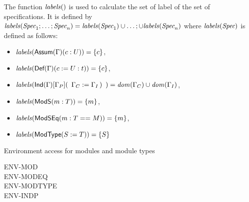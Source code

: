 The function $\mathit{labels}()$ is used to calculate the set of label of
the set of specifications. It is defined by
$\mathit{labels}(\textit{Spec}_1;\dots;\textit{Spec}_n)=\mathit{labels}(\textit{Spec}_1)\cup\dots;\cup\mathit{labels}(\textit{Spec}_n)$
where $\mathit{labels}(\textit{Spec})$ is defined as follows:
\begin{itemize}
\item $\mathit{labels}(\mbox{{\sf Assum}$(\Gamma)(c:U)$})=\{c\}$,
\item $\mathit{labels}(\mbox{{\sf Def}$(\Gamma)(c:=U:t)$})=\{c\}$,
\item
  $\mathit{labels}(\mbox{{\sf Ind}$(\Gamma)[\Gamma_P](\begin{array}[t]{l}\Gamma_C:=\Gamma_I \,)\end{array}$})=\mathit{dom}(\Gamma_C)\cup\mathit{dom}(\Gamma_I)$,
\item $\mathit{labels}({\sf ModS}({m}:{T}))=\{m\}$,
\item $\mathit{labels}({\sf ModSEq}({m}:{T}=={M}))=\{m\}$,
\item $\mathit{labels}({\sf ModType}({S}:={T}))=\{S\}$
\end{itemize}
Environment access for modules and module types
\begin{description}
\item[ENV-MOD]
\item[]
\item[ENV-MODEQ]
\item[ENV-MODTYPE]
\item[ENV-INDP]
\end{description}





